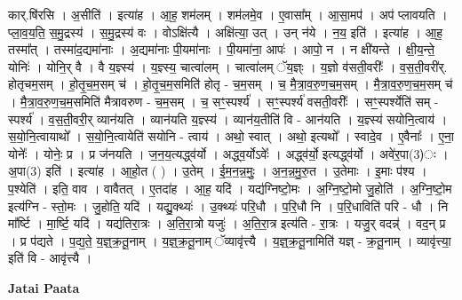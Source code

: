 \documentclass[17pt]{extarticle}
\begin{document}
कार्.षि॑रसि । अ॒सीति॑ । इत्या॑ह । आ॒ह॒ शम॑लम् । शम॑लमे॒व । ए॒वासा᳚म् । आ॒सा॒मप॑ । अप॑ प्लावयति । प्ला॒व॒य॒ति॒ स॒मु॒द्रस्य॑ । स॒मु॒द्रस्य॑ वः । वोऽक्षि॑त्यै । अक्षि॑त्या॒ उत् । उन् न॑ये । न॒य॒ इति॑ । इत्या॑ह । आ॒ह॒ तस्मा᳚त् । तस्मा॑द॒द्यमा॑नाः । अ॒द्यमा॑नाः पी॒यमा॑नाः । पी॒यमा॑ना॒ आपः॑ । आपो॒ न । न क्षी॑यन्ते । क्षी॒य॒न्ते॒ योनिः॑ । योनि॒र् वै । वै य॒ज्ञ्स्य॑ । य॒ज्ञ्स्य॒ चात्वा॑लम् । चात्वा॑लम् ॅय॒ज्ञ्ः । य॒ज्ञो व॑सती॒वरीः᳚ । व॒स॒ती॒वरी॑र्. होतृचम॒सम् । हो॒तृ॒च॒म॒सम् च॑ । हो॒तृ॒च॒म॒समिति॑ होतृ - च॒म॒सम् । च॒ मै॒त्रा॒व॒रु॒ण॒च॒म॒सम् । मै॒त्रा॒व॒रु॒ण॒च॒म॒सम् च॑ । मै॒त्रा॒व॒रु॒ण॒च॒म॒समिति॑ मैत्रावरुण - च॒म॒सम् । च॒ सꣳ॒॒स्पर्श्य॑ । सꣳ॒॒स्पर्श्य॑ वसती॒वरीः᳚ । सꣳ॒॒स्पर्श्येति॑ सम् - स्पर्श्य॑ । व॒स॒ती॒वरी॒र् व्यान॑यति । व्यान॑यति य॒ज्ञ्स्य॑ । व्यान॑य॒तीति॑ वि - आन॑यति । य॒ज्ञ्स्य॑ सयोनि॒त्वाय॑ । स॒यो॒नि॒त्वायाथो᳚ । स॒यो॒नि॒त्वायेति॑ सयोनि - त्वाय॑ । अथो॒ स्वात् । अथो॒ इत्यथो᳚ । स्वादे॒व । ए॒वैनाः᳚ । ए॒ना॒ योनेः᳚ । योनेः॒ प्र । प्र ज॑नयति । ज॒न॒य॒त्यद्ध्व॑र्यो । अद्ध्व॒र्योऽवेः᳚ । अद्ध्व॑र्यो॒ इत्यद्ध्व॑र्यो । अवे॑र॒पा(3)ः । अ॒पा(3) इति॑ । इत्या॑ह । आ॒हो॒त ( ) । उ॒तेम् । ई॒म॒न॒न्न॒मुः॒ । अ॒न॒न्न॒मु॒रु॒त । उ॒तेमाः । इ॒माः प॑श्य । प॒श्येति॑ । इति॒ वाव । वावैतत् । ए॒तदा॑ह । आ॒ह॒ यदि॑ । यद्य॑ग्निष्टो॒मः । अ॒ग्नि॒ष्टो॒मो जु॒होति॑ । अ॒ग्नि॒ष्टो॒म इत्य॑ग्नि - स्तो॒मः । जु॒होति॒ यदि॑ । यद्यु॒क्थ्यः॑ । उ॒क्थ्यः॑ परि॒धौ । प॒रि॒धौ नि । प॒रि॒धाविति॑ परि - धौ । नि मा᳚र्ष्टि । मा॒र्ष्टि॒ यदि॑ । यद्य॑तिरा॒त्रः । अ॒ति॒रा॒त्रो यजुः॑ । अ॒ति॒रा॒त्र इत्य॑ति - रा॒त्रः । यजु॒र् वदन्न्॑ । वद॒न् प्र । प्र प॑द्यते । प॒द्य॒ते॒ य॒ज्ञ्॒क्र॒तू॒नाम् । य॒ज्ञ्॒क्र॒तू॒नाम् ॅव्यावृ॑त्त्यै । य॒ज्ञ्॒क्र॒तू॒नामिति॑ यज्ञ् - क्र॒तू॒नाम् । व्यावृ॑त्त्या॒ इति॑ वि - आवृ॑त्त्यै । \newline

\textbf{Jatai Paata} \newline
\end{document}

